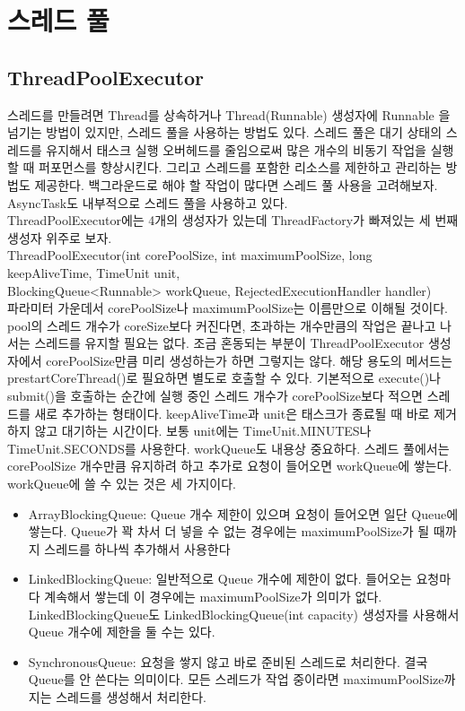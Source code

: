\section{스레드 풀}
\subsection{ThreadPoolExecutor}
스레드를 만들려면 Thread를 상속하거나 Thread(Runnable) 생성자에 Runnable 을 넘기는 방법이 있지만, 스레드 풀을 사용하는 방법도 있다.
스레드 풀은 대기 상태의 스레드를 유지해서 태스크 실행 오버헤드를 줄임으로써 많은 개수의 비동기 작업을 실행할 때 퍼포먼스를 향상시킨다. 
그리고 스레드를 포함한 리소스를 제한하고 관리하는 방법도 제공한다. 
백그라운드로 해야 할 작업이 많다면 스레드 풀 사용을 고려해보자. AsyncTask도 내부적으로 스레드 풀을 사용하고 있다.\\

ThreadPoolExecutor에는 4개의 생성자가 있는데 ThreadFactory가 빠져있는 세 번째 생성자 위주로 보자.\\

ThreadPoolExecutor(int corePoolSize, int maximumPoolSize, long keepAliveTime, TimeUnit unit,\\ BlockingQueue<Runnable> workQueue, RejectedExecutionHandler handler)\\

파라미터 가운데서 corePoolSize나 maximumPoolSize는 이름만으로 이해될 것이다. 
pool의 스레드 개수가 coreSize보다 커진다면, 초과하는 개수만큼의 작업은 끝나고 나서는 스레드를 유지할 필요는 없다. 
조금 혼동되는 부분이 ThreadPoolExecutor 생성자에서 corePoolSize만큼 미리 생성하는가 하면 그렇지는 않다. 해당 용도의 메서드는 prestartCoreThread()로 필요하면 별도로 호출할 수 있다. 기본적으로 execute()나 submit()을 호출하는 순간에 실행 중인 스레드 개수가 corePoolSize보다 적으면 스레드를 새로 추가하는 형태이다.
keepAliveTime과 unit은 태스크가 종료될 때 바로 제거하지 않고 대기하는 시간이다. 보통 unit에는 TimeUnit.MINUTES나 TimeUnit.SECONDS를 사용한다.
workQueue도 내용상 중요하다. 스레드 풀에서는 corePoolSize 개수만큼 유지하려 하고 추가로 요청이 들어오면 workQueue에 쌓는다. 
workQueue에 쓸 수 있는 것은 세 가지이다.
\begin{itemize}
\item ArrayBlockingQueue: Queue 개수 제한이 있으며 요청이 들어오면 일단 Queue에 쌓는다. Queue가 꽉 차서 더 넣을 수 없는 경우에는 maximumPoolSize가 될 때까지 스레드를 하나씩 추가해서 사용한다
\item LinkedBlockingQueue: 일반적으로 Queue 개수에 제한이 없다. 들어오는 요청마다 계속해서 쌓는데 이 경우에는 maximumPoolSize가 의미가 없다. LinkedBlockingQueue도 LinkedBlockingQueue(int capacity) 생성자를 사용해서 Queue 개수에 제한을 둘 수는 있다.
\item SynchronousQueue: 요청을 쌓지 않고 바로 준비된 스레드로 처리한다. 결국 Queue를 안 쓴다는 의미이다.
모든 스레드가 작업 중이라면 maximumPoolSize까지는 스레드를 생성해서 처리한다. 
\end{itemize}

